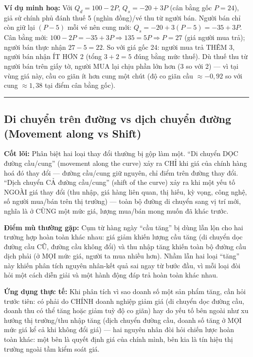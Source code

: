 \documentclass[
]{article}
\begin{document}
\textbf{Ví dụ minh hoạ:} Với \(Q_d = 100 - 2P\), \(Q_s = -20 + 3P\) (cân
bằng gốc \(P = 24\)), giả sử chính phủ đánh thuế 5 (nghìn đồng)/vé thu
từ người bán. Người bán chỉ còn giữ lại \((P - 5)\) mỗi vé nên cung mới:
\(Q_s = -20 + 3(P-5) = -35 + 3P\). Cân bằng mới:
\(100 - 2P = -35 + 3P \Rightarrow 135 = 5P \Rightarrow P = 27\) (giá
người mua trả); người bán thực nhận \(27 - 5 = 22\). So với giá gốc 24:
người mua trả THÊM 3, người bán nhận ÍT HƠN 2 (tổng \(3+2=5\) đúng bằng
mức thuế). Dù thuế thu từ người bán trên giấy tờ, người MUA lại chịu
phần lớn hơn (3 so với 2) --- vì tại vùng giá này, cầu co giãn ít hơn
cung một chút (độ co giãn cầu \(\approx -0{,}92\) so với cung
\(\approx 1{,}38\) tại điểm cân bằng gốc).

\begin{center}\rule{0.5\linewidth}{0.5pt}\end{center}

\subsection{Di chuyển trên đường vs dịch chuyển đường (Movement along vs
Shift)}\label{di-chuyux1ec3n-truxean-ux111ux1b0ux1eddng-vs-dux1ecbch-chuyux1ec3n-ux111ux1b0ux1eddng-movement-along-vs-shift}

\textbf{Cốt lõi:} Phân biệt hai loại thay đổi thường bị gộp làm một.
``Di chuyển DỌC đường cầu/cung'' (movement along the curve) xảy ra CHỈ
khi giá của chính hàng hoá đó thay đổi --- đường cầu/cung giữ nguyên,
chỉ điểm trên đường thay đổi. ``Dịch chuyển CẢ đường cầu/cung'' (shift
of the curve) xảy ra khi một yếu tố NGOÀI giá thay đổi (thu nhập, giá
hàng liên quan, thị hiếu, kỳ vọng, công nghệ, số người mua/bán trên thị
trường) --- toàn bộ đường di chuyển sang vị trí mới, nghĩa là ở CÙNG một
mức giá, lượng mua/bán mong muốn đã khác trước.

\textbf{Điểm mù thường gặp:} Cụm từ hàng ngày ``cầu tăng'' bị dùng lẫn
lộn cho hai trường hợp hoàn toàn khác nhau: giá giảm khiến lượng cầu
tăng (di chuyển dọc đường cầu CŨ, đường cầu không đổi) và thu nhập tăng
khiến toàn bộ đường cầu dịch phải (ở MỌI mức giá, người ta mua nhiều
hơn). Nhầm lẫn hai loại ``tăng'' này khiến phân tích nguyên nhân-kết quả
sai ngay từ bước đầu, vì mỗi loại đòi hỏi một cách diễn giải và một hành
động đáp trả hoàn toàn khác nhau.

\textbf{Ứng dụng thực tế:} Khi phân tích vì sao doanh số một sản phẩm
tăng, cần hỏi trước tiên: có phải do CHÍNH doanh nghiệp giảm giá (di
chuyển dọc đường cầu, doanh thu có thể tăng hoặc giảm tuỳ độ co giãn)
hay do yếu tố bên ngoài như xu hướng thị trường/thu nhập tăng (dịch
chuyển đường cầu, doanh số tăng ở MỌI mức giá kể cả khi không đổi giá)
--- hai nguyên nhân đòi hỏi chiến lược hoàn toàn khác: một bên là quyết
định giá của chính mình, bên kia là tín hiệu thị trường ngoài tầm kiểm
soát giá.
\end{document}

